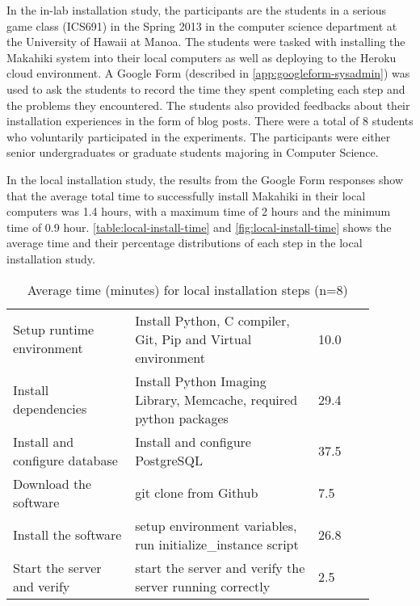 In the in-lab installation study, the participants are the students in a serious game class (ICS691) in the Spring 2013 in the computer science department at the University of Hawaii at Manoa. The students were tasked with installing the Makahiki system into their local computers as well as deploying to the Heroku cloud environment. A Google Form (described in \autoref{app:googleform-sysadmin}) was used to ask the students to record the time they spent completing each step and the problems they encountered. The students also provided feedbacks about their installation experiences in the form of blog posts. There were a total of 8 students who voluntarily participated in the experiments.  The participants were either senior undergraduates or graduate students majoring in Computer Science. 

In the local installation study, the results from the Google Form responses show that the average total time to successfully install Makahiki in their local computers was 1.4 hours, with a maximum time of 2 hours and the minimum time of 0.9 hour. \autoref{table:local-install-time} and \autoref{fig:local-install-time} shows the average time and their percentage distributions of each step in the local installation study.

\begin{table}[ht!]
  \centering
  \begin{tabular}{|p{0.3\linewidth}|P{0.45\linewidth}|P{0.14\linewidth}|}
    \hline
     &  &  \\
    \hline
    Setup runtime environment & Install Python, C compiler, Git, Pip and Virtual environment & 10.0 \\
    \hline
    Install dependencies & Install Python Imaging Library, Memcache, required python packages & 29.4 \\
    \hline
    Install and configure database & Install and configure PostgreSQL & 37.5 \\
    \hline
    Download the software & git clone from Github & 7.5 \\
    \hline
    Install the software & setup environment variables, run initialize\_instance script & 26.8 \\
    \hline
    Start the server and verify & start the server and verify the server running correctly & 2.5 \\
   \hline
    \end{tabular}
  \caption{Average time (minutes) for local installation steps (n=8)}
  \label{table:local-install-time}
\end{table}
    
